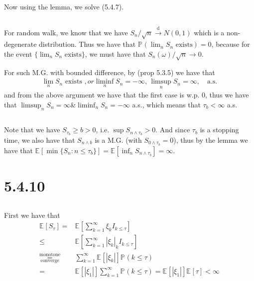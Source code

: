 \documentclass[11pt,a4paper]{ctexart}
\numberwithin{equation}{section}%
\begin{document}
Now using the lemma, we solve (5.4.7).

\subsection{}

For random walk, we know that we have $ S_n/\sqrt{n}\xrightarrow[]{\mathrm{d}} N(0,1) $ which is a non-degenerate distribution. Thus we have that $ \mathbb{P}_{  }\left( \lim_n S_n \text{ exists} \right)  = 0 $, because for the event $ \{\lim_n S_n \text{ exists}\} $, we must have that $ S_n(\omega )/\sqrt{n}\to 0 $. 

For such M.G. with bounded difference, by (prop 5.3.5) we have that 
\begin{align*}
    \lim_n S_n \text{ exists }, or \liminf_n S_n = -\infty,\, \limsup_n S_n = \infty,\quad \text{a.s.}
\end{align*}
and from the above argument we have that the first case is w.p. 0, thus we have that $ \limsup_n S_n = \infty \& \liminf_n S_n = -\infty $ a.s., which means that $ \tau_b<\infty $ a.s.

\subsection{}

Note that we have $ S_{\tau_b} \geq b >0 $, i.e. $ \sup S_{n\wedge \tau_b} >0 $. And since $ \tau_b $ is a stopping time, we also have that $ S_{n\wedge b} $ is a M.G. (with $ S_{0\wedge \tau_b}=0 $), thus by the lemma we have that $ \mathbb{E}_{  }\left[ \min\{S_n:n\leq \tau_b \}\right] =  \mathbb{E}_{  }\left[ \inf_n S_{n\wedge \tau_b} \right] = \infty  $.



\section{5.4.10}


\subsection{}
First we have that
\begin{align*}
    \mathbb{E}_{  }\left[ S_\tau \right]=& \mathbb{E}_{  }\left[ \sum_{k=1}^\infty \xi _k I_{k\leq \tau} \right] \\
    \leq& \mathbb{E}_{  }\left[ \sum_{k=1}^\infty \left\vert \xi _k \right\vert  _k I_{k\leq \tau} \right]\\
    \mathop{ = }\limits^{\text{monotone}}_{\text{converge}} & \sum_{k=1}^\infty \mathbb{E}_{  }\left[ \left\vert \xi _k \right\vert  \right] \mathbb{P}_{  }\left( k\leq \tau \right) \\
    =&\mathbb{E}_{  }\left[ \left\vert \xi _1 \right\vert  \right]\sum_{k=1}^\infty \mathbb{P}_{  }\left( k\leq \tau \right) = \mathbb{E}_{  }\left[ \left\vert \xi _1 \right\vert  \right] \mathbb{E}_{  }\left[ \tau \right] <\infty
\end{align*}
\end{document}
